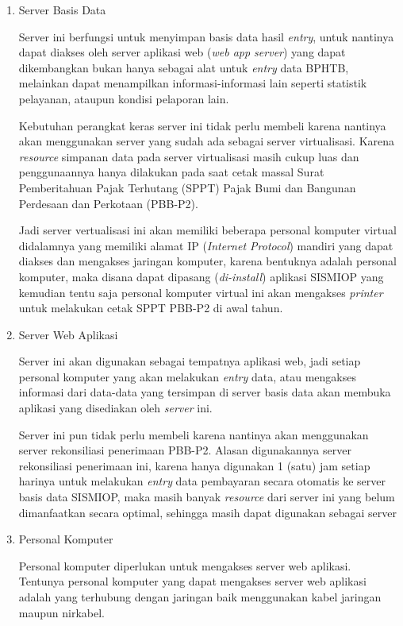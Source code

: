 \documentclass[pdftex,12pt, oneside]{article}
\begin{document}
\begin{enumerate}[1.]
  \item Server Basis Data
  
Server ini berfungsi untuk menyimpan basis data hasil \textit{entry}, untuk nantinya dapat diakses oleh server aplikasi web (\textit{web app server}) yang dapat dikembangkan bukan hanya sebagai alat untuk \textit{entry} data BPHTB, melainkan dapat menampilkan informasi-informasi lain seperti statistik pelayanan, ataupun kondisi pelaporan lain.

Kebutuhan perangkat keras server ini tidak perlu membeli karena nantinya akan menggunakan server yang sudah ada sebagai server virtualisasi. Karena \textit{resource} simpanan data pada server virtualisasi masih cukup luas dan penggunaannya hanya dilakukan pada saat cetak massal Surat Pemberitahuan Pajak Terhutang (SPPT) Pajak Bumi dan Bangunan Perdesaan dan Perkotaan (PBB-P2).

Jadi server vertualisasi ini akan memiliki beberapa personal komputer virtual didalamnya yang memiliki alamat IP (\textit{Internet Protocol}) mandiri yang dapat diakses dan mengakses jaringan komputer, karena bentuknya adalah personal komputer, maka disana dapat dipasang (\textit{di-install}) aplikasi SISMIOP yang kemudian tentu saja personal komputer virtual ini akan mengakses \textit{printer} untuk melakukan cetak SPPT PBB-P2 di awal tahun.

  \item Server Web Aplikasi
  
Server ini akan digunakan sebagai tempatnya aplikasi web, jadi setiap personal komputer yang akan melakukan \textit{entry} data, atau mengakses informasi dari data-data yang tersimpan di server basis data akan membuka aplikasi yang disediakan oleh \textit{server} ini.
  
Server ini pun tidak perlu membeli karena nantinya akan menggunakan server rekonsiliasi penerimaan PBB-P2. Alasan digunakannya server rekonsiliasi penerimaan ini, karena hanya digunakan 1 (satu) jam setiap harinya untuk melakukan \textit{entry} data pembayaran secara otomatis ke server basis data SISMIOP, maka masih banyak \textit{resource} dari server ini yang belum dimanfaatkan secara optimal, sehingga masih dapat digunakan sebagai server 

  \item Personal Komputer
  
Personal komputer diperlukan untuk mengakses server web aplikasi. Tentunya personal komputer yang dapat mengakses server web aplikasi adalah yang terhubung dengan jaringan baik menggunakan kabel jaringan maupun nirkabel. 


\end{enumerate}
\end{document}
